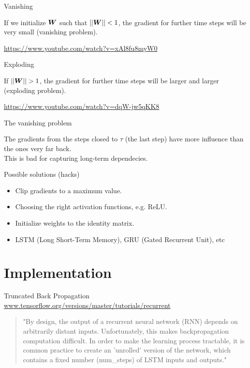 \documentclass[10pt]{beamer}
\begin{document}
\begin{frame}{Vanishing}

If we initialize $\bm{W}$ such that $||\bm{W}|| < 1$, the gradient for further time steps will be very small (\alert{vanishing problem}).

\vspace{0.8cm}
 \url{https://www.youtube.com/watch?v=xAl8fu8myW0}


\end{frame}

\begin{frame}{Exploding}

If $||\bm{W}|| > 1$, the gradient for further time steps will be larger and larger (\alert{exploding problem}).

\vspace{0.8cm}
 \url{https://www.youtube.com/watch?v=dqW-jw5qKK8}


\end{frame}


\begin{frame}{The vanishing problem}

The gradients from the steps closed to $\tau$ (the last step) have more influence than the ones very far back.\\

This is bad for capturing \alert{long-term dependecies}.
\end{frame}

\begin{frame}{Possible solutions (hacks)}
\begin{itemize}
\item Clip gradients to a maximum value.
\vspace{0.4cm}
\item Choosing the right activation functions, e.g. ReLU.
\vspace{0.4cm}
\item Initialize weights to the identity matrix.
\vspace{0.4cm}
\item LSTM (Long Short-Term Memory), GRU (Gated Recurrent Unit), etc
\end{itemize}
\end{frame}


\section{Implementation}

\begin{frame}{Truncated Back Propagation}
\url{www.tensorflow.org/versions/master/tutorials/recurrent}
\begin{quote}
"By design, the output of a recurrent neural network (RNN) depends on arbitrarily distant inputs. Unfortunately, this makes backpropagation computation difficult. In order to make the learning process tractable, \alert{it is common practice to create an 'unrolled' version of the network, which contains a fixed number (num\_steps) of LSTM inputs and outputs}."
\end{quote}
\end{frame}
\end{document}
